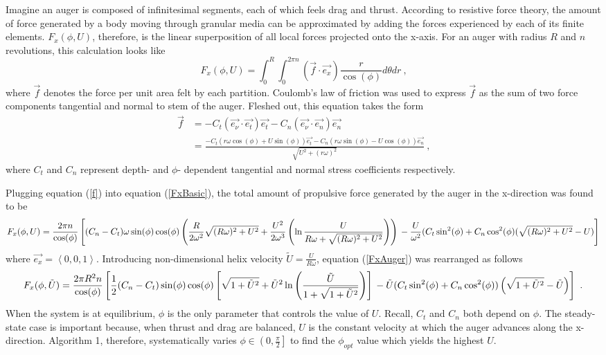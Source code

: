\documentclass[letterpaper, 11 pt]{article}
\begin{document}
Imagine an auger is composed of infinitesimal segments, each of which feels drag and thrust. According to resistive force theory, the amount of force generated by a body moving through granular media can be approximated by adding the forces experienced by each of its finite elements. $F_x(\phi,U)$, therefore, is the linear superposition of all local forces projected onto the x-axis. For an auger with radius $R$ and $n$ revolutions, this calculation looks like
\begin{equation}\label{FxBasic}
F_x(\phi,U) = \int_{0}^{R}\int_{0}^{2\pi n} (\vec{f}\cdot\vec{e_x})\frac{r}{\cos(\phi)} d\theta dr\ \text{,}
\end{equation}
where $\vec{f}$ denotes the force per unit area felt by each partition. Coulomb's law of friction was used to express $\vec{f}$ as the sum of two force components tangential and normal to stem of the auger. Fleshed out, this equation takes the form
\begin{equation}\label{f}
\begin{split} 
\vec{f} &= -C_t(\vec{e_\nu}\cdot\vec{e_t})\vec{e_t}-C_n(\vec{e_\nu}\cdot\vec
{e_n})\vec{e_n} \\
&=\frac{-C_t(r\omega\cos(\phi)+U\sin(\phi))\vec{e_t}-C_n(r\omega\sin(\phi)-U\cos(\phi))\vec{e_n}}{\sqrt{U^2+(r\omega)^2}}\ \text{,}
\end{split} 
\end{equation}
where $C_t$ and $C_n$ represent depth- and $\phi$- dependent tangential and normal stress coefficients respectively. 

Plugging equation (\ref{f}) into equation (\ref{FxBasic}), the total amount of propulsive force generated by the auger in the x-direction was found to be  
\begin{dmath}\label{FxAuger}
F_x(\phi,U) = \frac{2\pi n}{\cos(\phi)}\left[(C_n-C_t)\omega\sin(\phi)\cos(\phi)\left( \frac{R}{2\omega^2}\sqrt{(R\omega)^2+U^2}+\frac{U^2}{2\omega^3}\left( \ln\frac{U}{R\omega+\sqrt{(R\omega)^2+U^2}}\right) \right) \\
- \frac{U}{\omega^2}(C_t\sin^2(\phi)+C_n\cos^2(\phi)(\sqrt{(R\omega)^2+U^2}-U) \right] 
\end{dmath}
where $\vec{e_x} = \left\langle 0,0,1 \right\rangle $. Introducing non-dimensional helix velocity $\tilde{U} = \frac{U}{R\omega}$, equation (\ref{FxAuger}) was rearranged as follows
\begin{dmath}\label{NDFxAuger}
F_x(\phi, \tilde{U}) = \frac{2\pi R^2n}{\cos(\phi)}\left[\frac{1}{2}(C_n-C_t)\sin(\phi)\cos(\phi)\left[\sqrt{1+\tilde{U}^2}+\tilde{U}^2\ln\left(\frac{\tilde{U}}{1+\sqrt{1+\tilde{U}^2}} \right)  \right] \\
- \tilde{U}(C_t\sin^2(\phi)+C_n\cos^2(\phi))\left(\sqrt{1+\tilde{U}^2}-\tilde{U}\right) \right]\ \text{.} 
\end{dmath}
When the system is at equilibrium, $\phi$ is the only parameter that controls the value of $U$. Recall, $C_t$ and $C_n$ both depend on $\phi$. The steady-state case is important because, when thrust and drag are balanced, $U$ is the constant velocity at which the auger advances along the x-direction. Algorithm 1, therefore, systematically varies $\phi\in\left(0,\frac{\pi}{2} \right] $ to find the $\phi_{opt}$ value which yields the highest $U$.  
\end{document}
